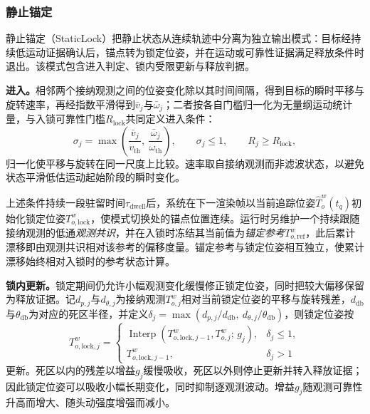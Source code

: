 \documentclass[review]{vgtc}
\begin{document}
\subsubsection{静止锚定}\label{sec:staticlock}

静止锚定（StaticLock）把静止状态从连续轨迹中分离为独立输出模式：目标经持续低运动证据确认后，锚点转为锁定位姿，并在运动或可靠性证据满足释放条件时退出。该模式包含进入判定、锁内受限更新与释放判据。

\textbf{进入。}相邻两个接纳观测之间的位姿变化除以其时间间隔，得到目标的瞬时平移与旋转速率，再经指数平滑得到$\bar{v}_j$与$\bar{\omega}_j$；二者按各自门槛归一化为无量纲运动统计量，与入锁可靠性门槛$R_{\mathrm{lock}}$共同定义进入条件：
\begin{equation}
\sigma_j = \max\left(\frac{\bar{v}_j}{v_{\mathrm{th}}},\ \frac{\bar{\omega}_j}{\omega_{\mathrm{th}}}\right), \qquad \sigma_j \leq 1, \qquad R_j \geq R_{\mathrm{lock}},
\label{eq:lock-entry}
\end{equation}
归一化使平移与旋转在同一尺度上比较。速率取自接纳观测而非滤波状态，以避免状态平滑低估运动起始阶段的瞬时变化。

上述条件持续一段驻留时间$\tau_{\mathrm{dwell}}$后，系统在下一渲染帧以当前追踪位姿$\widehat{T}_o^w(t_q)$初始化锁定位姿$T_{o,\mathrm{lock}}^w$，使模式切换处的锚点位置连续。运行时另维护一个持续跟随接纳观测的低通\emph{观测共识}，并在入锁时冻结其当前值为\emph{锚定参考}$T_{o,\mathrm{ref}}^w$，此后累计漂移即由观测共识相对该参考的偏移度量。锚定参考与锁定位姿相互独立，使累计漂移始终相对入锁时的参考状态计算。

\textbf{锁内更新。}锁定期间仍允许小幅观测变化缓慢修正锁定位姿，同时把较大偏移保留为释放证据。记$d_{p,j}$与$d_{\theta,j}$为接纳观测$T_{o,j}^{w}$相对当前锁定位姿的平移与旋转残差，$d_{\mathrm{db}}$与$\theta_{\mathrm{db}}$为对应的死区半径，并定义$\delta_j = \max(d_{p,j}/d_{\mathrm{db}},\ d_{\theta,j}/\theta_{\mathrm{db}})$，则锁定位姿按
\begin{equation}
T_{o,\mathrm{lock},j}^w =
\begin{cases}
\operatorname{Interp}\left(T_{o,\mathrm{lock},j-1}^w, T_{o,j}^{w};\, g_j\right), & \delta_j \leq 1, \\
T_{o,\mathrm{lock},j-1}^w, & \delta_j > 1
\end{cases}
\label{eq:lock-update}
\end{equation}
更新。死区以内的残差以增益$g_j$缓慢吸收，死区以外则停止更新并转入释放证据；因此锁定位姿可以吸收小幅长期变化，同时抑制逐观测波动。增益$g_j$随观测可靠性升高而增大、随头动强度增强而减小。
\end{document}

